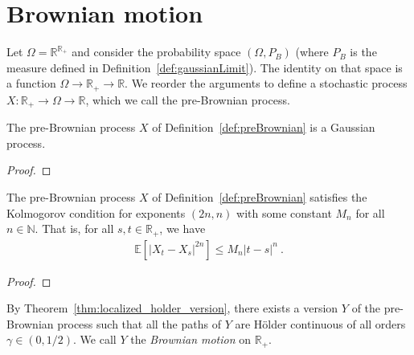 \chapter{Brownian motion}
\label{chap:brownian}


\begin{definition}\label{def:preBrownian}
  \leanok
Let $\Omega = \mathbb{R}^{\mathbb{R}_+}$ and consider the probability space $(\Omega, P_B)$ (where $P_B$ is the measure defined in Definition~\ref{def:gaussianLimit}).
The identity on that space is a function $\Omega \to \mathbb{R}_+ \to \mathbb{R}$.
We reorder the arguments to define a stochastic process $X : \mathbb{R}_+ \to \Omega \to \mathbb{R}$, which we call the pre-Brownian process.
\end{definition}


\begin{lemma}\label{lem:isGaussianProcess_preBrownian}
  \leanok
  The pre-Brownian process $X$ of Definition~\ref{def:preBrownian} is a Gaussian process.
\end{lemma}

\begin{proof}

\end{proof}


\begin{lemma}\label{lem:isKolmogorovProcess_preBrownian}
  The pre-Brownian process $X$ of Definition~\ref{def:preBrownian} satisfies the Kolmogorov condition for exponents $(2n,n)$ with some constant $M_n$ for all $n \in \mathbb{N}$.
  That is, for all $s, t \in \mathbb{R}_+$, we have
  \begin{align*}
    \mathbb{E} \left[ |X_t - X_s|^{2n} \right] \le M_n |t - s|^n
    \: .
  \end{align*}
\end{lemma}

\begin{proof}

\end{proof}


\begin{definition}\label{def:brownianMotion}
  \notready
By Theorem~\ref{thm:localized_holder_version}, there exists a version $Y$ of the pre-Brownian process such that all the paths of $Y$ are Hölder continuous of all orders $\gamma \in (0, 1/2)$.
We call $Y$ the \emph{Brownian motion} on $\mathbb{R}_+$.
\end{definition}


